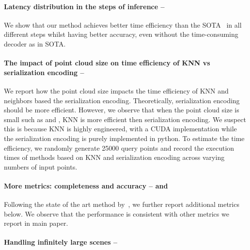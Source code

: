 
\paragraph{Latency distribution in the steps of inference  -- } 
We show that our method achieves better time efficiency than the SOTA~\cite{huang2023neural} in all different steps whilst having better accuracy, even without the time-consuming decoder as in SOTA.


\paragraph{The impact of point cloud size on time efficiency of KNN vs serialization encoding -- }
We report how the point cloud size impacts the time efficiency of KNN and neighbors based the serialization encoding. Theoretically, serialization encoding should be more efficient. However, we observe that when the point cloud size is small such as \synthetic and \scannet, KNN is more efficient then serialization encoding. We suspect this is because KNN is highly engineered, with a CUDA implementation while the serialization encoding is purely implemented in python.  To estimate the time efficiency, we randomly generate 25000 query points and record the execution times of methods based on KNN and serialization encoding across varying numbers of input points.

\paragraph{More metrics: completeness and accuracy --  and }
Following the state of the art method by~\citet{huang2023neural}, we further report additional metrics below.
We observe that the performance is consistent with other metrics we report in main paper.   


\paragraph{{Handling infinitely large scenes} --
}


